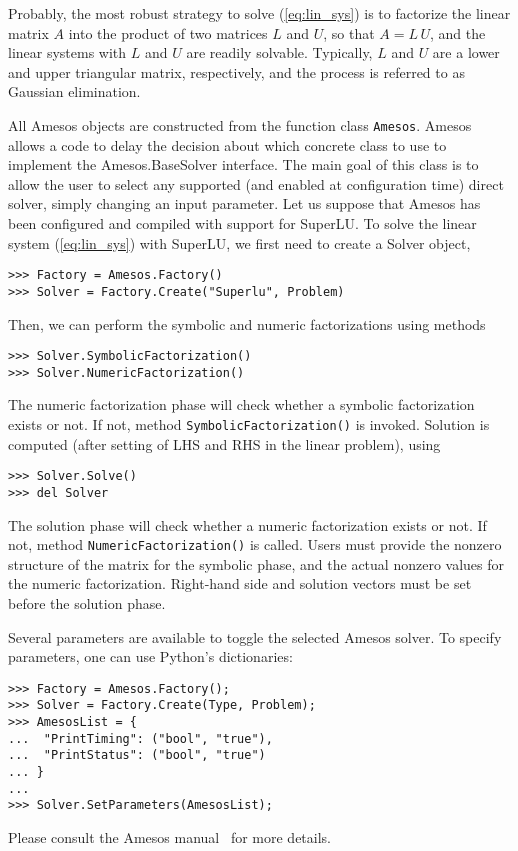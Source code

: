 \documentclass[10pt,relax]{SANDreport}
\begin{document}
\smallskip

Probably, the most robust strategy to solve (\ref{eq:lin_sys}) is to factorize
the linear matrix $A$ into the product of two matrices $L$ and $U$, so that
$A = L \, U$, and 
the linear systems with $L$ and $U$ are readily solvable. Typically,
$L$ and $U$ are a lower and upper triangular matrix, respectively, and the
process is referred to as Gaussian elimination. 

All Amesos objects are constructed from the function class
\verb!Amesos!.  Amesos allows a code to delay the
decision about which concrete class to use to implement the
Amesos.BaseSolver interface. The main goal of this class is to allow
the user to select any supported (and enabled at configuration time)
direct solver, simply changing an input parameter. Let us suppose that Amesos
has been configured and compiled with support for SuperLU. To solve the linear
system (\ref{eq:lin_sys}) with SuperLU, we first need to create a Solver
object,
\begin{verbatim}
>>> Factory = Amesos.Factory()
>>> Solver = Factory.Create("Superlu", Problem)
\end{verbatim}
Then, we can perform the symbolic and numeric factorizations using methods
\begin{verbatim}
>>> Solver.SymbolicFactorization()
>>> Solver.NumericFactorization()
\end{verbatim}
The numeric factorization phase will check whether a symbolic
factorization exists or not. If not, method
\verb!SymbolicFactorization()! is invoked.  Solution is computed (after
setting of LHS and RHS in the linear problem), using
\begin{verbatim}
>>> Solver.Solve()
>>> del Solver
\end{verbatim}
The solution phase will check whether a numeric factorization exists or
not. If not, method \verb!NumericFactorization()! is called.
Users must provide the nonzero structure of the matrix for the symbolic
phase, and the actual nonzero values for the numeric
factorization. Right-hand side and solution vectors must be set before
the solution phase.
  
Several parameters are available to toggle the selected Amesos solver.
To specify parameters, one can use Python's dictionaries:
\begin{verbatim}
>>> Factory = Amesos.Factory();
>>> Solver = Factory.Create(Type, Problem);
>>> AmesosList = {
...  "PrintTiming": ("bool", "true"),
...  "PrintStatus": ("bool", "true")
... }
...
>>> Solver.SetParameters(AmesosList);
\end{verbatim}
Please consult the Amesos manual~\cite{Amesos-Reference-Guide} for more
details.
\end{document}
